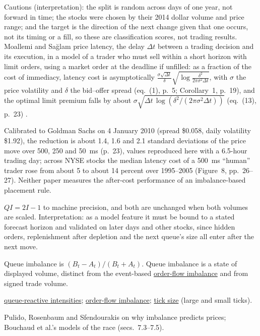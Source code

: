 \begin{qfdefinition}
Cautions (interpretation): the split is random across days of one year, not forward in time; the stocks were chosen by their 2014 dollar volume and price range; and the target is the direction of the next change given that one occurs, not its timing or a fill, so these are classification scores, not trading results. Moallemi and Sağlam price latency, the delay $\Delta t$ between a trading decision and its execution, in a model of a trader who must sell within a short horizon with limit orders, using a market order at the deadline if unfilled: as a fraction of the cost of immediacy, latency cost is asymptotically $\frac{\sigma\sqrt{\Delta t}}{\delta}\sqrt{\log\frac{\delta^2}{2\pi\sigma^2\Delta t}}$, with $\sigma$ the price volatility and $\delta$ the bid--offer spread (eq.~(1), p.~5; Corollary~1, p.~19), and the optimal limit premium falls by about $\sigma\sqrt{\Delta t\,\log(\delta^2/(2\pi\sigma^2\Delta t))}$ (eq.~(13), p.~23) \citep[revision of 5 February 2013]{moallemi-saglam-2013}.

Calibrated to Goldman Sachs on 4 January 2010 (spread \$0.058, daily volatility \$1.92), the reduction is about 1.4, 1.6 and 2.1 standard deviations of the price move over 500, 250 and 50~ms (p.~23), values reproduced here with a 6.5-hour trading day; across NYSE stocks the median latency cost of a 500~ms ``human'' trader rose from about 5 to about 14 percent over 1995--2005 (Figure~8, pp.~26--27). Neither paper measures the after-cost performance of an imbalance-based placement rule.

 $QI=2I-1$ to machine precision, and both are unchanged when both volumes are scaled. Interpretation: as a model feature it must be bound to a stated forecast horizon and validated on later days and other stocks, since hidden orders, replenishment after depletion and the next queue's size all enter after the next move.

 Queue imbalance is $(B_t-A_t)/(B_t+A_t)$. Queue imbalance is a state of displayed volume, distinct from the event-based \hyperref[def:order-flow-imbalance]{order-flow imbalance} and from signed trade volume.

 \hyperref[mod:queue-reactive-intensities]{queue-reactive intensities}; \hyperref[def:order-flow-imbalance]{order-flow imbalance}; \hyperref[def:tick-size]{tick size} (large and small ticks).

 Pulido, Rosenbaum and Sfendourakis on why imbalance predicts prices; Bouchaud et al.'s models of the race (secs.~7.3--7.5).

\end{qfdefinition}

